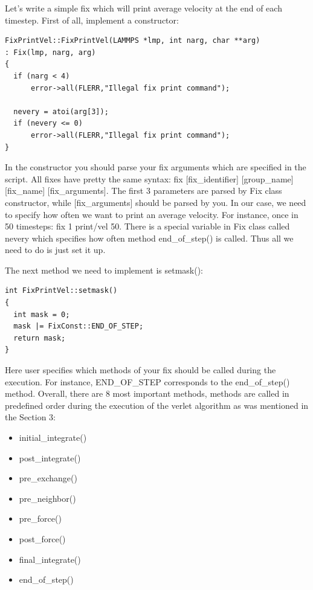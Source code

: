 \documentclass{article}
\begin{document}
Let's write a simple fix which will print average velocity at the end
of each timestep. First of all, implement a constructor:

 \begin{center}
 \begin{verbatim}
FixPrintVel::FixPrintVel(LAMMPS *lmp, int narg, char **arg)
: Fix(lmp, narg, arg)
{
  if (narg < 4)
      error->all(FLERR,"Illegal fix print command");

  nevery = atoi(arg[3]);
  if (nevery <= 0)
      error->all(FLERR,"Illegal fix print command");
}
  \end{verbatim}
 \end{center}

In the constructor you should parse your fix arguments which are
specified in the script. All fixes have pretty the same syntax: fix
[fix\_identifier] [group\_name] [fix\_name] [fix\_arguments]. The
first 3 parameters are parsed by Fix class constructor, while
[fix\_arguments] should be parsed by you. In our case, we need to
specify how often we want to print an average velocity. For instance,
once in 50 timesteps: fix 1 print/vel 50. There is a special variable
in Fix class called nevery which specifies how often method
end\_of\_step() is called. Thus all we need to do is just set it up.

The next method we need to implement is setmask():
\begin{center}
\begin{verbatim}
int FixPrintVel::setmask()
{
  int mask = 0;
  mask |= FixConst::END_OF_STEP;
  return mask;
}
\end{verbatim}
\end{center}

Here user specifies which methods of your fix should be called during
the execution. For instance, END\_OF\_STEP corresponds to the
end\_of\_step() method. Overall, there are 8 most important methods,
methods are called in predefined order during the execution of the
verlet algorithm as was mentioned in the Section 3:

\begin{itemize}
\item initial\_integrate()
\item post\_integrate()
\item pre\_exchange()
\item pre\_neighbor()
\item pre\_force()
\item post\_force()
\item final\_integrate()
\item end\_of\_step()
\end{itemize}
\end{document}
